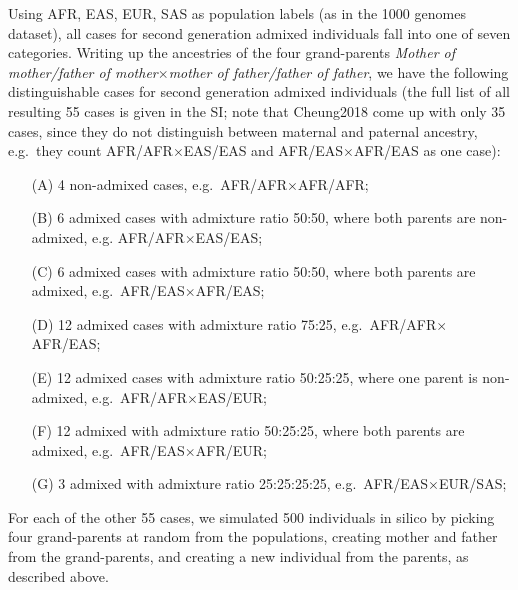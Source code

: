\documentclass[12pt]{article}
\theoremstyle{definition}
\begin{document}
Using AFR, EAS, EUR, SAS as population labels (as in the 1000 genomes
dataset), all cases for second generation admixed individuals fall
into one of seven categories. Writing up the ancestries of the four
grand-parents {\it Mother of mother/father of mother$\times$mother of
  father/father of father}, we have the following distinguishable
cases for second generation admixed individuals (the full list of all
resulting 55 cases is given in the SI; note that \cite{article}{Cheung2018}
come up with only 35 cases, since they do not distinguish between
maternal and paternal ancestry, e.g.\ they count
AFR/AFR$\times$EAS/EAS and AFR/EAS$\times$AFR/EAS as one case):

\begin{itemize}
\item[(A)] 4 non-admixed cases, e.g.\ AFR/AFR$\times$AFR/AFR;
\item[(B)] 6 admixed cases with admixture ratio 50:50, where both
  parents are non-admixed, e.g. AFR/AFR$\times$EAS/EAS;
\item[(C)] 6 admixed cases with admixture ratio 50:50, where both
  parents are admixed, e.g.\ AFR/EAS$\times$AFR/EAS;
\item[(D)] 12 admixed cases with admixture ratio 75:25, e.g.\
  AFR/AFR$\times$AFR/EAS;
\item[(E)] 12 admixed cases with admixture ratio 50:25:25, where one
  parent is non-admixed, e.g.\ AFR/AFR$\times$EAS/EUR;
\item[(F)] 12 admixed with admixture ratio 50:25:25, where both
  parents are admixed, e.g.\ AFR/EAS$\times$AFR/EUR;
\item[(G)] 3 admixed with admixture ratio 25:25:25:25, e.g.\
  AFR/EAS$\times$EUR/SAS;
\end{itemize}
For each of the other 55 cases, we simulated 500 individuals in silico
by picking four grand-parents at random from the populations, creating
mother and father from the grand-parents, and creating a new
individual from the parents, as described above.
\end{document}
